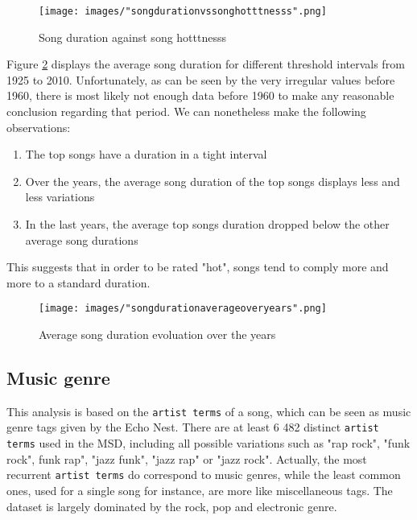 \documentclass[11pt]{article}
\renewcommand\_{\textunderscore\allowbreak}
\begin{document}
\begin{figure}[h!]
\centering
\captionsetup{width=1.0\textwidth}
\texttt{[image: images/"song\_duration\_vs\_song\_hotttnesss".png]}
\caption{Song duration against song hotttnesss}
\label{fig:song_duration}
\end{figure}

Figure \ref{fig:song_duration_over_years} displays the average song duration for different threshold intervals from 1925 to 2010. 
Unfortunately, as can be seen by the very irregular values before 1960, there is most likely not enough data before 1960 to make any reasonable conclusion regarding that period. 
We can nonetheless make the following observations:
\begin{enumerate}
\itemsep 0mm
\item The top songs have a duration in a tight interval
\item Over the years, the average song duration of the top songs displays less and less variations
\item In the last years, the average top songs duration dropped below the other average song durations
\end{enumerate}

This suggests that in order to be rated "hot", songs tend to comply more and more to a standard duration.

\begin{figure}[h!]
\centering
\captionsetup{width=1.0\textwidth}
\texttt{[image: images/"song\_duration\_average\_over\_years".png]}
\caption{Average song duration evoluation over the years}
\label{fig:song_duration_over_years}
\end{figure}

\subsection{Music genre}
This analysis is based on the \texttt{artist terms} of a song, which can be seen as music genre tags given by the Echo Nest.
There are at least 6 482 distinct \texttt{artist terms} used in the MSD, including all possible variations such as "rap rock", "funk rock", funk rap", "jazz funk", "jazz rap" or "jazz rock".
Actually, the most recurrent \texttt{artist terms} do correspond to music genres, while the least common ones, used for a single song for instance, are more like miscellaneous tags.
The dataset is largely dominated by the rock, pop and electronic genre.
\end{document}
